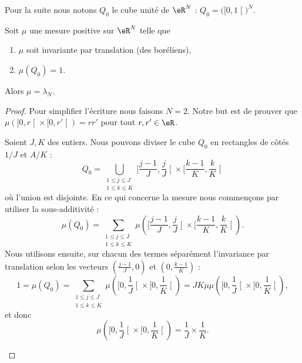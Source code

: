 Pour la suite nous notons \( Q_0\) le cube unité de \( \eR^N\) : \( Q_0=\big( \mathopen[ 0 , 1 \mathclose[ \big)^N\).

\begin{theorem}        \label{ThoCABFooHbUzWc}
    Soit \( \mu\) une mesure positive sur \( \eR^N\) telle que
    \begin{enumerate}
        \item
            \( \mu\) soit invariante par translation (des boréliens),
        \item
            \( \mu(Q_0)=1\).
    \end{enumerate}
    Alors \( \mu=\lambda_N\).
\end{theorem}
    
\begin{proof}
    Pour simplifier l'écriture nous faisons \( N=2\). Notre but est de prouver que \( \mu(  \mathopen[ 0 , r \mathclose[\times \mathopen[ 0 , r' \mathclose[ )=rr'\) pour tout \( r,r'\in \eR\).

    \begin{subproof}
    \item[Longueur =\( 1/J\)]
        Soient \( J,K\) des entiers. Nous pouvons diviser le cube \( Q_0\) en rectangles de côtés \( 1/J\) et \( A/K\) :
        \begin{equation}
            Q_0=\bigcup_{\substack{1\leq j\leq J\\1\leq k\leq K}}\mathopen[ \frac{ j-1 }{ J } , \frac{ j }{ J } \mathclose[\times \mathopen[ \frac{ k-1 }{ K } , \frac{ k }{ K } \mathclose[
        \end{equation}
        où l'union est disjointe. En ce qui concerne la mesure nous commençons par utiliser la sous-additivité :
        \begin{equation}
            \mu(Q_0)=\sum_{\substack{1\leq j\leq J\\1\leq k\leq K}}\mu\left(  \mathopen[ \frac{ j-1 }{ J } , \frac{ j }{ J } \mathclose[\times \mathopen[ \frac{ k-1 }{ K } , \frac{ k }{ K } \mathclose[      \right).
        \end{equation}
        Nous utilisons ensuite, sur chacun des termes séparément l'invariance par translation selon les vecteurs \( (\frac{ j-1 }{ J },0)\) et \( ( 0,\frac{ k-1 }{ K } )\) :
        \begin{equation}
            1=\mu(Q_0)=\sum_{\substack{1\leq j\leq J\\1\leq k\leq K}}\mu\left(  \mathopen[ 0,\frac{1}{ J } \mathclose[\times \mathopen[0,\frac{1}{ K }\mathclose[      \right)=JK\mu\mu\left(  \mathopen[ 0,\frac{1}{ J } \mathclose[\times \mathopen[0,\frac{1}{ K }\mathclose[      \right),
        \end{equation}
        et donc
        \begin{equation}
            \mu\left(  \mathopen[ 0,\frac{1}{ J } \mathclose[\times \mathopen[0,\frac{1}{ K }\mathclose[      \right)=\frac{1}{ J }\times \frac{1}{ K }.
        \end{equation}
    \item[Longueur \( L/K\)]


\end{subproof}
\end{proof}
